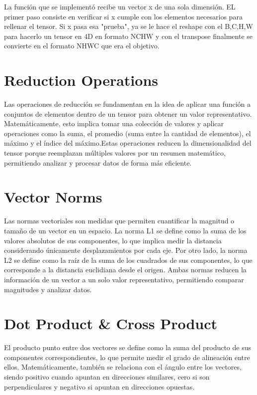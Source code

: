 \documentclass[12pt, letterpaper]{article}
\begin{document}
La función que se implementó recibe un vector x de una sola dimensión. EL primer paso consiste en verificar si x cumple con los elementos necesarios para rellenar
el tensor. Si x pasa esa "prueba", ya se le hace el reshape con el B,C,H,W para hacerlo un tensor en 4D en formato NCHW y con el transpose finalmente se convierte en el formato NHWC
que era el objetivo. 

\newpage

\section{Reduction Operations}

Las operaciones de reducción se fundamentan en la idea de aplicar una función a conjuntos de elementos dentro de un tensor para obtener un valor representativo. 
Matemáticamente, esto implica tomar una colección de valores y aplicar operaciones como la suma, el promedio (suma entre 
la cantidad de elementos), el máximo y el índice del máximo.Estas operaciones reducen la dimensionalidad del tensor porque reemplazan múltiples valores por un resumen matemático,
permitiendo analizar y procesar datos de forma más eficiente.

\newpage

\section{Vector Norms}

Las normas vectoriales son medidas que permiten cuantificar la magnitud o tamaño de un vector en un espacio. La norma L1 se define 
como la suma de los valores absolutos de sus componentes, lo que implica medir la distancia considerando únicamente desplazamientos 
por cada eje. Por otro lado, la norma L2 se define como la raíz de la suma de los cuadrados de sus componentes, lo que corresponde a 
la distancia euclidiana desde el origen. Ambas normas reducen la información de un vector a un solo valor representativo, permitiendo 
comparar magnitudes y analizar datos.

\newpage

\section{Dot Product \& Cross Product}

El producto punto entre dos vectores se define como la suma del producto de sus componentes correspondientes, lo que permite medir 
el grado de alineación entre ellos. Matemáticamente, también se relaciona con el ángulo entre los vectores, siendo positivo cuando apuntan en direcciones 
similares, cero si son perpendiculares y negativo si apuntan en direcciones opuestas.
\end{document}
